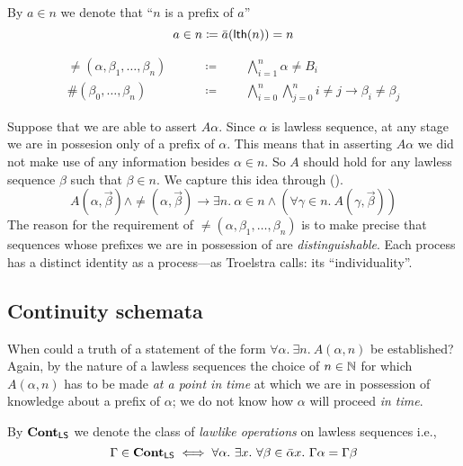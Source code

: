 \documentclass[11pt]{article}
\begin{document}
\begin{notation}
  By $a \in n$ we denote that ``$n$ is a prefix of $a$''
  \[ a \in n \coloneqq \bar{a}(\mathsf{lth}(n)) = n \]
\end{notation}

\begin{notation}
  \begin{align*}
  \neq(\alpha, \beta_1, \dots, \beta_n) \qquad &\coloneqq \qquad
    \bigwedge_{i=1}^{n} \alpha \neq B_i\\
  \#(\beta_0, \dots, \beta_n) \qquad &\coloneqq \qquad
    \bigwedge_{i=0}^n \bigwedge_{j=0}^n i \neq j \rightarrow \beta_i \neq \beta_j
  \end{align*}
\end{notation}

Suppose that we are able to assert $A\alpha$. Since $\alpha$ is lawless
sequence, at any stage we are in possesion only of a prefix of $\alpha$. This
means that in asserting $A\alpha$ we did not make use of any information
besides  $\alpha \in n$. So $A$ should hold for any lawless sequence $\beta$
such that $\beta \in n$. We capture this idea through (\LSIII).
\begin{equation}\label{LS3}
  A(\alpha, \vec{\beta}) \land \neq(\alpha, \vec{\beta})
  \rightarrow \exists n.\ \alpha \in n \land
  (\forall \gamma \in n.\ A(\gamma, \vec{\beta}))
  \tag{\LSIII}
\end{equation}
The reason for the requirement of $\neq(\alpha, \beta_1, \dots, \beta_n)$ is
to make precise that sequences whose prefixes we are in possession of are
\emph{distinguishable}. Each process has a distinct identity as a process---as
Troelstra \cite[pg. 11]{troelstra-choice-sequence} calls: its ``individuality''.

\subsection{Continuity schemata}

When could a truth of a statement of the form
$\forall \alpha.\ \exists n.\ A(\alpha, n)$ be established? Again, by the
nature of a lawless sequences the choice of $n \in \mathbb{N}$ for which
$A(\alpha, n)$ has to be made \emph{at a point in time} at which we are in
possession of knowledge about a prefix of $\alpha$; we do not know how
$\alpha$ will proceed \emph{in time}.

\begin{notation}
  By $\mathbf{Cont_{\mathsf{LS}}}$ we denote the class of \emph{lawlike operations} on lawless
  sequences i.e.,
  \[ \Gamma \in \mathbf{Cont_{\mathsf{LS}}} \iff
      \forall \alpha.\ \exists x.\ \forall \beta \in \bar{\alpha}x.
      \ \Gamma\alpha = \Gamma\beta \]
\end{notation}
\end{document}
